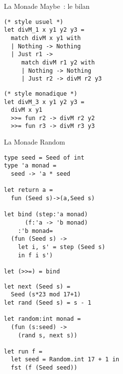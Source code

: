\documentclass[10pt]{beamer}
\begin{document}
\begin{frame}[fragile]{La Monade Maybe~: le bilan}
  \begin{multicols*}{2}
\begin{verbatim}
(* style usuel *)
let divM_1 x y1 y2 y3 =
  match divM x y1 with
  | Nothing -> Nothing
  | Just r1 ->
     match divM r1 y2 with
     | Nothing -> Nothing
     | Just r2 -> divM r2 y3
\end{verbatim}
    \columnbreak{}
\begin{verbatim}
(* style monadique *)
let divM_3 x y1 y2 y3 =
  divM x y1
  >>= fun r2 -> divM r2 y2
  >>= fun r3 -> divM r3 y3
\end{verbatim}
  \end{multicols*}
\end{frame}

\begin{frame}[fragile]{La Monade Random}
  \begin{multicols*}{2}
\begin{verbatim}
type seed = Seed of int
type 'a monad =
  seed -> 'a * seed

let return a =
  fun (Seed s)->(a,Seed s)

let bind (step:'a monad)
      (f:'a -> 'b monad)
    :'b monad=
  (fun (Seed s) ->
    let i, s' = step (Seed s)
    in f i s')

let (>>=) = bind
\end{verbatim}
    \columnbreak{}
\begin{verbatim}
let next (Seed s) =
  Seed (s*23 mod 17+1)
let rand (Seed s) = s - 1

let random:int monad =
  (fun (s:seed) ->
    (rand s, next s))

let run f =
  let seed = Random.int 17 + 1 in
  fst (f (Seed seed))
\end{verbatim}
  \end{multicols*}
  \begin{center}
  \end{center}
\end{frame}
\end{document}
